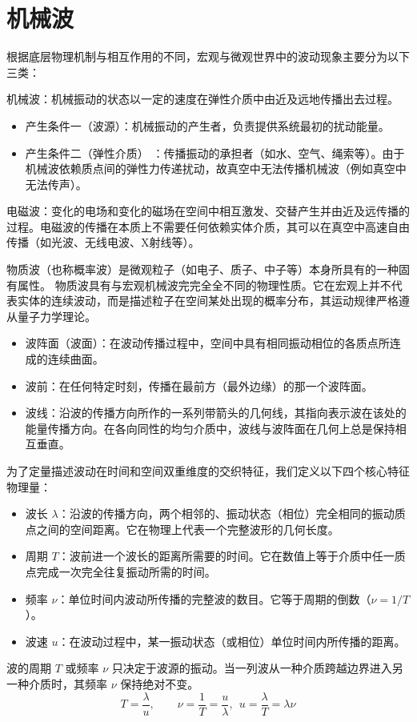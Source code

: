 

\chapter{机械波}

根据底层物理机制与相互作用的不同，宏观与微观世界中的波动现象主要分为以下三类：

\begin{definition}
机械波：机械振动的状态以一定的速度在弹性介质中由近及远地传播出去过程。
\begin{itemize}
    \item 产生条件一（波源）：机械振动的产生者，负责提供系统最初的扰动能量。
    \item 产生条件二（弹性介质） ：传播振动的承担者（如水、空气、绳索等）。由于机械波依赖质点间的弹性力传递扰动，故真空中无法传播机械波（例如真空中无法传声）。
\end{itemize}
电磁波：变化的电场和变化的磁场在空间中相互激发、交替产生并由近及远传播的过程。电磁波的传播在本质上不需要任何依赖实体介质，其可以在真空中高速自由传播（如光波、无线电波、X射线等）。

物质波（也称概率波）是微观粒子（如电子、质子、中子等）本身所具有的一种固有属性。 物质波具有与宏观机械波完完全全不同的物理性质。它在宏观上并不代表实体的连续波动，而是描述粒子在空间某处出现的概率分布，其运动规律严格遵从量子力学理论。
\end{definition}

\begin{definition}
\begin{itemize}
\item 波阵面（波面）：在波动传播过程中，空间中具有相同振动相位的各质点所连成的连续曲面。
\item 波前：在任何特定时刻，传播在最前方（最外边缘）的那一个波阵面。
\item 波线：沿波的传播方向所作的一系列带箭头的几何线，其指向表示波在该处的能量传播方向。在各向同性的均匀介质中，波线与波阵面在几何上总是保持相互垂直。
\end{itemize}
为了定量描述波动在时间和空间双重维度的交织特征，我们定义以下四个核心特征物理量：
\begin{itemize}
\item 波长 $\lambda$：沿波的传播方向，两个相邻的、振动状态（相位）完全相同的振动质点之间的空间距离。它在物理上代表一个完整波形的几何长度。
\item 周期 $T$：波前进一个波长的距离所需要的时间。它在数值上等于介质中任一质点完成一次完全往复振动所需的时间。
\item 频率 $\nu$：单位时间内波动所传播的完整波的数目。它等于周期的倒数（$\nu = 1/T$）。
\item 波速 $u$：在波动过程中，某一振动状态（或相位）单位时间内所传播的距离。
\end{itemize}
波的周期 $T$ 或频率 $\nu$ 只决定于波源的振动。当一列波从一种介质跨越边界进入另一种介质时，其频率 $\nu$ 保持绝对不变。
$$T = \frac{\lambda}{u}, \qquad \nu = \frac{1}{T} = \frac{u}{\lambda},~~\boxed{u = \frac{\lambda}{T} = \lambda \nu}$$
\end{definition}

